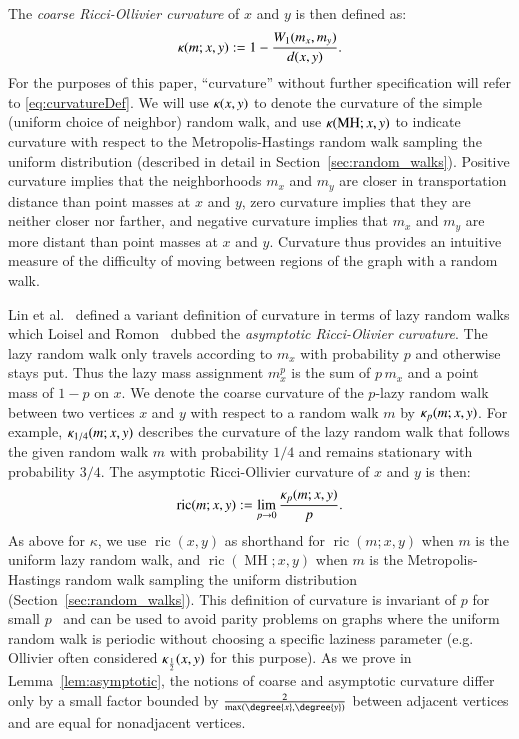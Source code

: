 \documentclass[]{elsarticle}
\newcommand{\MH}{\operatorname{MH}}
\newcommand{\curvature}[2][]{%
    \ifthenelse{\equal{#1}{}}%
		{\kappa(#2)}%
		{\kappa_{#1}(#2)}%
}
\newcommand{\ric}[1]{
	\operatorname{ric}(#1)%
}
\begin{document}
The \emph{coarse Ricci-Ollivier curvature} of $x$ and $y$ is then defined as:
\vspace{-0.5em}
\begin{equation}
\curvature{m; x, y} := 1 - \frac{W_1(m_x, m_y)}{d(x, y)}.
\label{eq:curvatureDef}
\end{equation}
For the purposes of this paper, ``curvature'' without further specification will refer to \eqref{eq:curvatureDef}.
We will use $\curvature{x,y}$ to denote the curvature of the simple (uniform choice of neighbor) random walk, and use $\curvature{\MH; x,y}$ to indicate curvature with respect to the Metropolis-Hastings random walk sampling the uniform distribution (described in detail in Section~\ref{sec:random_walks}).
Positive curvature implies that the neighborhoods $m_x$ and $m_y$ are closer in transportation distance than point masses at $x$ and $y$, zero curvature implies that they are neither closer nor farther, and negative curvature implies that $m_x$ and $m_y$ are more distant than point masses at $x$ and $y$.
Curvature thus provides an intuitive measure of the difficulty of moving between regions of the graph with a random walk.

Lin et al.~\citep{lin2011ricci} defined a variant definition of curvature in terms of lazy random walks which Loisel and Romon~\citep{Loisel2014-hu} dubbed the \emph{asymptotic Ricci-Olivier curvature}.
The lazy random walk only travels according to $m_x$ with probability $p$ and otherwise stays put.
Thus the lazy mass assignment $m^p_x$ is the sum of $p\, m_x$ and a point mass of $1 - p$ on $x$.
We denote the coarse curvature of the $p$-lazy random walk between two vertices $x$ and $y$ with respect to a random walk $m$ by $\curvature[p]{m; x,y}$.
For example, $\curvature[1/4]{m; x,y}$ describes the curvature of the lazy random walk that follows the given random walk $m$ with probability $1/4$ and remains stationary with probability $3/4$.
The asymptotic Ricci-Ollivier curvature of $x$ and $y$ is then:
\begin{equation}
\ric{m; x, y} := \lim_{p \rightarrow 0} \frac{\curvature[p]{m; x,y}}{p} .
\label{eq:asympCurvatureDef}
\end{equation}
As above for $\kappa$, we use $\ric{x, y}$ as shorthand for $\ric{m; x, y}$ when $m$ is the uniform lazy random walk, and $\ric{\MH; x, y}$ when $m$ is the Metropolis-Hastings random walk sampling the uniform distribution (Section~\ref{sec:random_walks}).
This definition of curvature is invariant of $p$ for small $p$~\citep{Loisel2014-hu} and can be used to avoid parity problems on graphs where the uniform random walk is periodic without choosing a specific laziness parameter (e.g. Ollivier often considered $\curvature[\frac{1}{2}]{x,y}$ for this purpose).
As we prove in Lemma~\ref{lem:asymptotic}, the notions of coarse and asymptotic curvature differ only by a small factor bounded by $\frac{2}{\max(\degree{x}, \degree{y})}$ between adjacent vertices and are equal for nonadjacent vertices.
\end{document}
